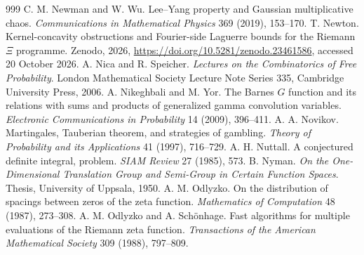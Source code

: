 \begin{thebibliography}{999}
 C. M. Newman and W. Wu. Lee--Yang property and Gaussian multiplicative chaos. \emph{Communications in Mathematical Physics} 369 (2019), 153--170.
 T. Newton. Kernel-concavity obstructions and Fourier-side Laguerre bounds for the Riemann $\Xi$ programme. Zenodo, 2026, \url{https://doi.org/10.5281/zenodo.23461586}, accessed 20 October 2026.
 A. Nica and R. Speicher. \emph{Lectures on the Combinatorics of Free Probability}. London Mathematical Society Lecture Note Series 335, Cambridge University Press, 2006.
 A. Nikeghbali and M. Yor. The Barnes $G$ function and its relations with sums and products of generalized gamma convolution variables. \emph{Electronic Communications in Probability} 14 (2009), 396--411.
 A. A. Novikov. Martingales, Tauberian theorem, and strategies of gambling. \emph{Theory of Probability and its Applications} 41 (1997), 716--729.
 A. H. Nuttall. A conjectured definite integral, problem. \emph{SIAM Review} 27 (1985), 573.
 B. Nyman. \emph{On the One-Dimensional Translation Group and Semi-Group in Certain Function Spaces}. Thesis, University of Uppsala, 1950.
 A. M. Odlyzko. On the distribution of spacings between zeros of the zeta function. \emph{Mathematics of Computation} 48 (1987), 273--308.
 A. M. Odlyzko and A. Sch\"onhage. Fast algorithms for multiple evaluations of the Riemann zeta function. \emph{Transactions of the American Mathematical Society} 309 (1988), 797--809.

\end{thebibliography}
